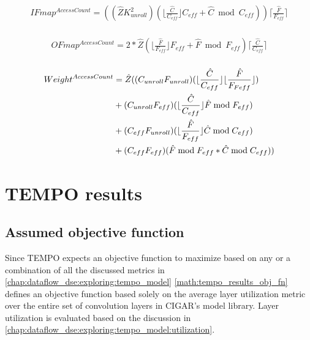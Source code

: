\begin{equation}
    \begin{aligned}
        IFmap^{AccessCount} = ((\hat{Z} K_{unroll}^2) (\lfloor\frac{\hat{C}}{C_{eff}} \rfloor C_{eff} + \hat{C}\bmod C_{eff}))\lceil\frac{\hat{F}}{F_{eff}}\rceil \\
    \end{aligned}
    \label{math:memory_access_ifmap}
\end{equation}
  
\begin{equation}
    \begin{aligned}
        OFmap^{AccessCount} = 2*\hat{Z} (\lfloor\frac{\hat{F}}{F_{eff}}\rfloor F_{eff}+\hat{F}\bmod F_{eff}) \lceil\frac{\hat{C}}{C_{eff}}\rceil \\
    \end{aligned}
    \label{math:memory_access_ofmap}
\end{equation}

\begin{equation}
    \begin{aligned}
        Weight^{AccessCount} & = \hat{Z}((C_{unroll}F_{unroll})(\lfloor\frac{\hat{C}}{C_{eff}} \rfloor \lfloor\frac{\hat{F}}{F_{Feff}}\rfloor) \\
            & +(C_{unroll}F_{eff})(\lfloor\frac{\hat{C}}{C_{eff}} \rfloor \hat{F}\bmod F_{eff}) \\
            & +(C_{eff}F_{unroll})(\lfloor\frac{\hat{F}}{F_{eff}} \rfloor \hat{C}\bmod C_{eff}) \\
            & + (C_{eff}F_{eff})(\hat{F}\bmod F_{eff}\space* \hat{C}\bmod C_{eff}))
        \end{aligned}
    \label{math:memory_access_weights}
\end{equation}

\section{TEMPO results}
\label{chap:dataflow_dse:exploring:results}

\subsection{Assumed objective function}
\label{chap:dataflow_dse:exploring:results:obj_fn}

Since TEMPO expects an objective function to maximize based on any or a
combination of all the discussed metrics in
\autoref{chap:dataflow_dse:exploring:tempo_model}
\autoref{math:tempo_results_obj_fn} defines an objective function based solely
on the average layer utilization metric over the entire set of convolution
layers in CIGAR's model library. Layer utilization is evaluated based on the
discussion in \autoref{chap:dataflow_dse:exploring:tempo_model:utilization}. 

